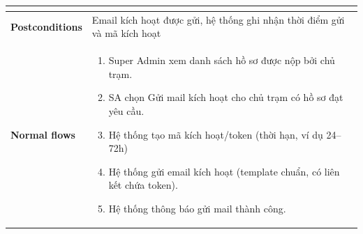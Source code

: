 \begin{enumerate}[label=\textbf{\alph*)}]
\begin{itemize}
\begin{center}
\begin{longtable}{|m{}|m{}|}
\begin{itemize}
          \end{itemize}\\
          \hline
          \textbf{Postconditions} &
          Email kích hoạt được gửi, hệ thống ghi nhận thời điểm gửi và mã kích hoạt\\
          \hline
          \textbf{Normal flows} &
          \begin{enumerate}[label=\arabic*.]
            \item Super Admin xem danh sách hồ sơ được nộp bởi chủ trạm.
            \item SA chọn Gửi mail kích hoạt cho chủ trạm có hồ sơ đạt yêu cầu.
            \item Hệ thống tạo mã kích hoạt/token (thời hạn, ví dụ 24--72h)
            \item Hệ thống gửi email kích hoạt (template chuẩn, có liên kết chứa token).
            \item Hệ thống thông báo gửi mail thành công.


\end{enumerate}
\end{longtable}
\end{center}
\end{itemize}
\end{enumerate}
